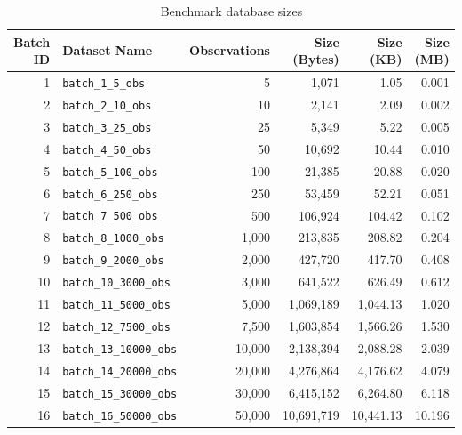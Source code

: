 \begin{table}[h]
\centering
\begin{tabular}{|r|l|r|r|r|r|}
\hline
\textbf{Batch ID} & \textbf{Dataset Name} & \textbf{Observations} & \textbf{Size (Bytes)} & \textbf{Size (KB)} & \textbf{Size (MB)} \\
\hline
1  & \texttt{batch\_1\_5\_obs}      & 5      & 1,071      & 1.05     & 0.001 \\
\hline
2  & \texttt{batch\_2\_10\_obs}     & 10     & 2,141      & 2.09     & 0.002 \\
\hline
3  & \texttt{batch\_3\_25\_obs}     & 25     & 5,349      & 5.22     & 0.005 \\
\hline
4  & \texttt{batch\_4\_50\_obs}     & 50     & 10,692     & 10.44    & 0.010 \\
\hline
5  & \texttt{batch\_5\_100\_obs}    & 100    & 21,385     & 20.88    & 0.020 \\
\hline
6  & \texttt{batch\_6\_250\_obs}    & 250    & 53,459     & 52.21    & 0.051 \\
\hline
7  & \texttt{batch\_7\_500\_obs}    & 500    & 106,924    & 104.42   & 0.102 \\
\hline
8  & \texttt{batch\_8\_1000\_obs}   & 1,000  & 213,835    & 208.82   & 0.204 \\
\hline
9  & \texttt{batch\_9\_2000\_obs}   & 2,000  & 427,720    & 417.70   & 0.408 \\
\hline
10 & \texttt{batch\_10\_3000\_obs}  & 3,000  & 641,522    & 626.49   & 0.612 \\
\hline
11 & \texttt{batch\_11\_5000\_obs}  & 5,000  & 1,069,189  & 1,044.13 & 1.020 \\
\hline
12 & \texttt{batch\_12\_7500\_obs}  & 7,500  & 1,603,854  & 1,566.26 & 1.530 \\
\hline
13 & \texttt{batch\_13\_10000\_obs} & 10,000 & 2,138,394  & 2,088.28 & 2.039 \\
\hline
14 & \texttt{batch\_14\_20000\_obs} & 20,000 & 4,276,864  & 4,176.62 & 4.079 \\
\hline
15 & \texttt{batch\_15\_30000\_obs} & 30,000 & 6,415,152  & 6,264.80 & 6.118 \\
\hline
16 & \texttt{batch\_16\_50000\_obs} & 50,000 & 10,691,719 & 10,441.13 & 10.196 \\
\hline
\end{tabular}
\caption{Benchmark database sizes}
\label{tab:batch-sizes}
\end{table}


